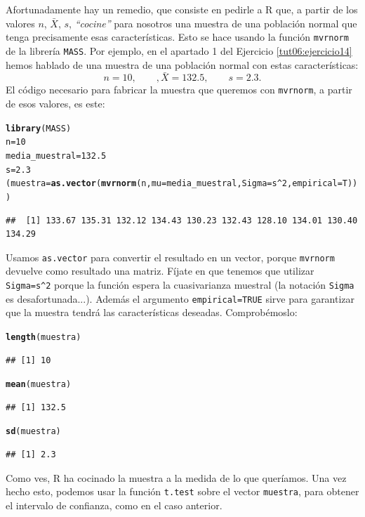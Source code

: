 \documentclass[10pt,a4paper]{article}\usepackage[]{graphicx}\usepackage[]{color}
\makeatletter
\newcommand{\hlnum}[1]{\textcolor[rgb]{0.686,0.059,0.569}{#1}}%
\newcommand{\hlopt}[1]{\textcolor[rgb]{0,0,0}{#1}}%
\newcommand{\hlstd}[1]{\textcolor[rgb]{0.345,0.345,0.345}{#1}}%
\newcommand{\hlkwb}[1]{\textcolor[rgb]{0.69,0.353,0.396}{#1}}%
\newcommand{\hlkwc}[1]{\textcolor[rgb]{0.333,0.667,0.333}{#1}}%
\newcommand{\hlkwd}[1]{\textcolor[rgb]{0.737,0.353,0.396}{\textbf{#1}}}%
\newenvironment{kframe}{%
 \def\at@end@of@kframe{}%
 \ifinner\ifhmode%
  \def\at@end@of@kframe{\end{minipage}}%
  \begin{minipage}{\columnwidth}%
 \fi\fi%
 \def\FrameCommand##1{\hskip\@totalleftmargin \hskip-\fboxsep
 \colorbox{shadecolor}{##1}\hskip-\fboxsep
     \hskip-\linewidth \hskip-\@totalleftmargin \hskip\columnwidth}%
 \MakeFramed {\advance\hsize-\width
   \@totalleftmargin\z@ \linewidth\hsize
   \@setminipage}}%
 {\par\unskip\endMakeFramed%
 \at@end@of@kframe}
\newenvironment{knitrout}{}{} %
\makeatother
\begin{document}
Afortunadamente hay un remedio, que consiste en pedirle a R que, a partir de los valores $n$, $\bar X$, $s$,  {\em ``cocine''} para nosotros una muestra de una población normal que tenga precisamente esas características. Esto se hace usando la función {\tt mvrnorm} de la librería {\tt MASS}.  Por ejemplo, en el apartado 1 del Ejercicio \ref{tut06:ejercicio14} hemos hablado de una muestra de una población normal con estas características:
\[n = 10, \qquad, \bar X = 132.5, \qquad s=2.3.\]
El código necesario para fabricar la muestra que queremos con {\tt mvrnorm}, a partir de esos valores, es este:
\begin{knitrout}
\color{fgcolor}\begin{kframe}
\begin{alltt}
\hlkwd{library}\hlstd{(MASS)}
\hlstd{n} \hlkwb{=} \hlnum{10}
\hlstd{media_muestral} \hlkwb{=} \hlnum{132.5}
\hlstd{s} \hlkwb{=} \hlnum{2.3}
\hlstd{(muestra} \hlkwb{=} \hlkwd{as.vector}\hlstd{(}\hlkwd{mvrnorm}\hlstd{(n,} \hlkwc{mu}\hlstd{=media_muestral,} \hlkwc{Sigma}\hlstd{=s}\hlopt{^}\hlnum{2}\hlstd{,} \hlkwc{empirical}\hlstd{=T)))}
\end{alltt}
\begin{verbatim}
##  [1] 133.67 135.31 132.12 134.43 130.23 132.43 128.10 134.01 130.40 134.29
\end{verbatim}
\end{kframe}
\end{knitrout}
Usamos {\tt as.vector} para convertir el resultado en un vector, porque {\tt mvrnorm} devuelve como resultado una matriz. Fíjate en que tenemos que utilizar \verb/Sigma=s^2/ porque la función espera la cuasivarianza muestral (la notación {\tt Sigma} es desafortunada...). Además el argumento {\tt empirical=TRUE} sirve para garantizar que la muestra tendrá las características deseadas. Comprobémoslo:
\begin{knitrout}
\color{fgcolor}\begin{kframe}
\begin{alltt}
\hlkwd{length}\hlstd{(muestra)}
\end{alltt}
\begin{verbatim}
## [1] 10
\end{verbatim}
\begin{alltt}
\hlkwd{mean}\hlstd{(muestra)}
\end{alltt}
\begin{verbatim}
## [1] 132.5
\end{verbatim}
\begin{alltt}
\hlkwd{sd}\hlstd{(muestra)}
\end{alltt}
\begin{verbatim}
## [1] 2.3
\end{verbatim}
\end{kframe}
\end{knitrout}
Como ves, R ha cocinado la muestra a la medida de lo que queríamos. Una vez hecho esto, podemos usar la función {\tt t.test} sobre el vector {\tt muestra}, para obtener el intervalo de confianza, como en el caso anterior.
\end{document}
